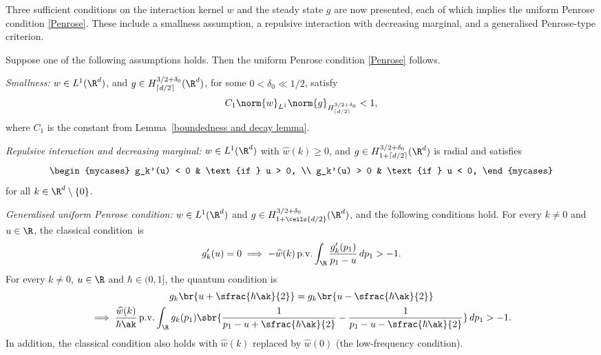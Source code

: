 Three sufficient conditions on the interaction kernel \( w \) and the steady state \( g \) are now presented, each of which implies the uniform Penrose condition \eqref{Penrose}. These include a smallness assumption, a repulsive interaction with decreasing marginal, and a generalised Penrose-type criterion.
\begin{proposition}\label{sufficientforPenrose}
Suppose one of the following assumptions holds. Then the uniform Penrose condition \eqref{Penrose} follows.
\begin{enumeratei}
\item \label{smallness} \textit{Smallness:}
\( w \in L^1(\R^d) \), and \( g \in H^{3/2+\delta_0}_{\lceil d/2 \rceil}(\R^d) \), for some \( 0 < \delta_0 \ll 1/2 \), satisfy
\[
C_1 \norm{w}_{L^1} \norm{g}_{H^{3/2+\delta_0}_{\lceil d/2 \rceil}} < 1,
\]
where \( C_1 \) is the constant from Lemma~\ref{boundedness and decay lemma}.
\item \label{marginal} \textit{Repulsive interaction and decreasing marginal:}
\( w \in L^1(\R^d) \) with \( \widehat w(k) \geq 0 \), and \( g \in H^{3/2+\delta_0}_{1 + \lceil d/2 \rceil}(\R^d) \) is radial and satisfies
\begin{align}\label{marginalcases}
\begin{mycases}
g_k'(u) < 0 & \text{if } u > 0, \\
g_k'(u) > 0 & \text{if } u < 0,
\end{mycases}
\end{align}
for all \( k \in \R^d\setminus\{0\} \).
\item \textit{Generalised uniform Penrose condition:} \label{generalisedPenrose(iii)} $w\in L^1(\R^d)$ and $g\in H^{3/2+\delta_0}_{1+\ceils{d/2}}(\R^d)$, and the following conditions hold. For every $k\neq0$ and $u\in\R$, the classical condition~is
\begin{align*}
g_k'(u)=0\implies -\widehat w(k)\,\mathrm{p.v.}\int_{\R}\frac{g_k'(p_1)}{p_1-u}\,dp_1>-1.
\end{align*}
For every $k\neq0$, $u\in\R$ and $\hbar\in(0,1]$, the quantum condition is
\begin{multline*}
g_k\br{u+\sfrac{\hbar\ak}{2}}=g_k\br{u-\sfrac{\hbar \ak}{2}}\\
\implies
\frac{\widehat w(k)}{\hbar \ak}\,\mathrm{p.v.}\int_{\R}g_k(p_1)\sbr{\frac{1}{p_1-u+\sfrac{\hbar\ak}{2}}-\frac{1}{p_1-u-\sfrac{\hbar \ak}{2}}}\,dp_1>- 1.
\end{multline*}
In addition, the classical condition also holds with $\widehat w(k)$ replaced by $\widehat w(0)$ (the low-frequency condition).
\end{enumeratei}

\end{proposition}
